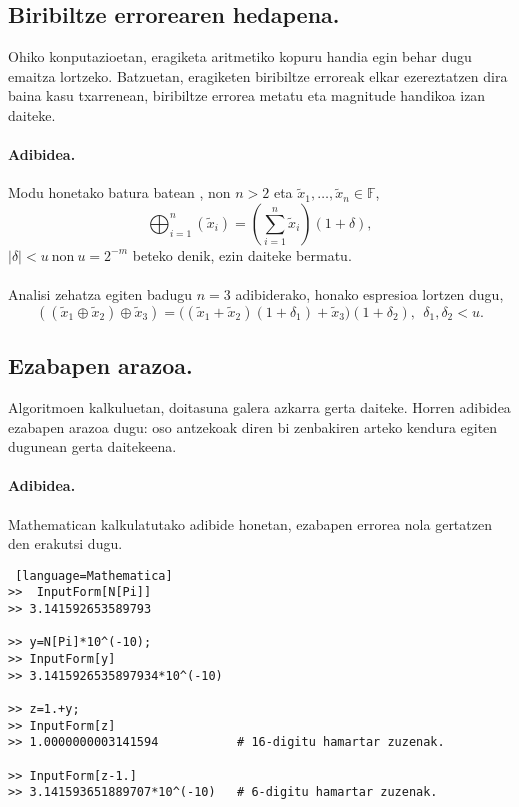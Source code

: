 \subsection*{Biribiltze errorearen hedapena.}


Ohiko konputazioetan, eragiketa aritmetiko kopuru handia egin behar dugu emaitza lortzeko. Batzuetan, eragiketen biribiltze erroreak elkar ezereztatzen dira baina kasu txarrenean, biribiltze errorea metatu eta magnitude handikoa izan daiteke.   

\paragraph*{Adibidea.} 
Modu honetako batura batean , non $n>2$ eta $\tilde x_1,\dots,\tilde x_n \in \mathbb{F}$,  
\begin{equation*}
\bigoplus_{i=1}^{n}(\tilde x_i)=(\sum\limits_{i=1}^{n} \tilde x_i)(1+\delta),
\end{equation*}
$|\delta|<u \ \text{non} \  u=2^{-m}$ beteko denik, ezin daiteke bermatu. 

\paragraph*{}Analisi zehatza egiten badugu $n=3$ adibiderako, honako espresioa lortzen dugu,
\begin{equation*}
((\tilde x_1 \oplus \tilde x_2) \oplus \tilde x_3)  = 
  \big((\tilde x_1 + \tilde x_2)(1+\delta_1)
  +\tilde x_3 \big) (1+\delta_2), \ \ \delta_1,\delta_2<u.
\end{equation*}

\subsection*{Ezabapen arazoa.}

Algoritmoen kalkuluetan, doitasuna galera azkarra gerta daiteke. Horren adibidea ezabapen arazoa dugu: oso antzekoak diren bi zenbakiren arteko kendura egiten dugunean gerta daitekeena. 

\paragraph*{Adibidea.} Mathematican kalkulatutako adibide honetan, ezabapen errorea nola gertatzen den erakutsi dugu. 
\begin{lstlisting} [language=Mathematica]
>>  InputForm[N[Pi]]
>> 3.141592653589793

>> y=N[Pi]*10^(-10);
>> InputForm[y]
>> 3.1415926535897934*10^(-10)

>> z=1.+y;
>> InputForm[z]
>> 1.0000000003141594           # 16-digitu hamartar zuzenak.

>> InputForm[z-1.]
>> 3.141593651889707*10^(-10)   # 6-digitu hamartar zuzenak.

\end{lstlisting}


